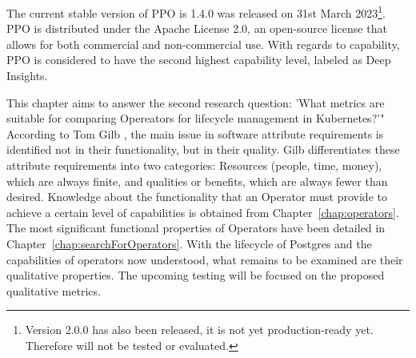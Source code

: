 The current stable version of PPO is 1.4.0 was released on 31st March 2023\footnote[3]{Version 2.0.0 has also been released, it is not yet production-ready yet. Therefore will not be tested or evaluated.}. \cite{PerconaDocuV2} PPO is distributed under the Apache License 2.0, an open-source license that allows for both commercial and non-commercial use. With regards to capability, PPO is considered to have the second highest capability level, labeled as Deep Insights. \cite{OperatorHubPercona}



This chapter aims to answer the second research question: 'What metrics are suitable for comparing Opereators for lifecycle management in
Kubernetes?'" According to Tom Gilb \cite{gilb1988principles}, the main issue in software attribute requirements is identified not in their functionality, but in their quality. Gilb differentiates these attribute requirements into two categories: Resources (people, time, money), which are always finite, and qualities or benefits, which are always fewer than desired. Knowledge about the functionality that an Operator must provide to achieve a certain level of capabilities is obtained from Chapter~\ref{chap:operators}. The most significant functional properties of Operators have been detailed in Chapter~\ref{chap:searchForOperators}. With the lifecycle of Postgres and the capabilities of operators now understood, what remains to be examined are their qualitative properties. The upcoming testing will be focused on the proposed qualitative metrics.

